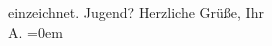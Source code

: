 \begin{ledgroupsized}[t]{13cm}
{{{                  einzeichnet.}}}\label{K_L01619_1h}\pend
           \pstart
           Jugend?\pend
           \pstart
           \label{T_L01619_1v}\label{T_L01619_1h}\pend
           \pstart
           {\pb}Herzliche Grüße,\pend
           \pstart
           Ihr{\\[\baselineskip]}\spacefill\mbox{A.}\pend
           \leftskip=0em{}          \endnumbering{}\end{ledgroupsized}  \newcommand{\dateiname}{L01619}\newcommand{\titel}{Arthur Schnitzler an Richard Beer-Hofmann, 1. 8. 1906}\newcommand{\editorInnen}{Martin Anton Müller und Gerd-Hermann Susen}
            \footnotesize
\begin{ledgroupsized}[t]{11.5cm}
\end{ledgroupsized}
         
      
